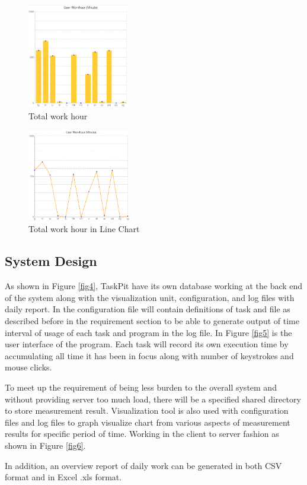 \documentclass [paper]{ieice}
\begin{document}
\begin{figure}[h]
	\centering	
\includegraphics[width=0.4\textwidth]{fig2}
	\caption{Total work hour}
	\label{fig2}
\end{figure}

\begin{figure}[h]
	\centering	
\includegraphics[width=0.4\textwidth]{fig3}
	\caption{Total work hour in Line Chart}
	\label{fig3}
\end{figure}
	
\subsection{System Design}
	As shown in Figure \ref{fig4}, TaskPit have its own database working at the back end of the system along with the visualization unit, configuration, and log files with daily report. In the configuration file will contain definitions of task and file as described before in the requirement section to be able to generate output of time interval of usage of each task and program in the log file. In Figure \ref{fig5} is the user interface of the program. Each task will record its own execution time by accumulating all time it has been in focus along with number of keystrokes and mouse clicks. \par
	To meet up the requirement of being less burden to the overall system and without providing server too much load, there will be a specified shared directory to store measurement result. Visualization tool is also used with configuration files and log files to graph visualize chart from various aspects of measurement results for specific period of time. Working in the client to server fashion as shown in Figure \ref{fig6}. \par
	In addition, an overview report of daily work can be generated in both CSV format and in Excel .xls format. \par
	
\end{document}

